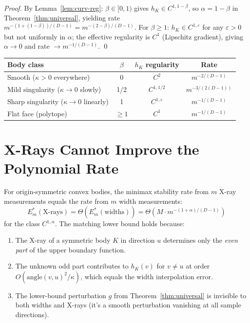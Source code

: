 \begin{proof}
By Lemma~\ref{lem:curv-reg}: $\beta \in [0,1)$ gives $h_K \in C^{1, 1-\beta}$, so $\alpha = 1 - \beta$ in Theorem~\ref{thm:universal}, yielding rate $m^{-(1 + (1-\beta))/(D-1)} = m^{-(2-\beta)/(D-1)}$. For $\beta \geq 1$: $h_K \in C^{1,\varepsilon}$ for any $\varepsilon > 0$ but not uniformly in $\alpha$; the effective regularity is $C^1$ (Lipschitz gradient), giving $\alpha \to 0$ and rate $\to m^{-1/(D-1)}$. \qed
\end{proof}

\begin{center}
\renewcommand{\arraystretch}{1.4}
\begin{tabular}{lccc}
\toprule
\textbf{Body class} & $\beta$ & $h_K$ \textbf{regularity} & \textbf{Rate} \\
\midrule
Smooth ($\kappa > 0$ everywhere) & 0 & $C^{2}$ & $m^{-2/(D-1)}$ \\
Mild singularity ($\kappa \to 0$ slowly) & 1/2 & $C^{1, 1/2}$ & $m^{-3/(2(D-1))}$ \\
Sharp singularity ($\kappa \to 0$ linearly) & 1 & $C^{1, \varepsilon}$ & $m^{-1/(D-1)}$ \\
Flat face (polytope) & $\geq 1$ & $C^{1}$ & $m^{-1/(D-1)}$ \\
\bottomrule
\end{tabular}
\end{center}


\section{X-Rays Cannot Improve the Polynomial Rate}

\begin{theorem}
\label{thm:parity}
For origin-symmetric convex bodies, the minimax stability rate from $m$ X-ray measurements equals the rate from $m$ width measurements:
\[
  E_m^*(\text{X-rays}) = \Theta(E_m^*(\text{widths})) = \Theta\!\left(M \cdot m^{-(1+\alpha)/(D-1)}\right)
\]
for the class $C^{1,\alpha}$. The matching lower bound holds because:
\begin{enumerate}
  \item The X-ray of a symmetric body $K$ in direction $u$ determines only the \emph{even part} of the upper boundary function.
  \item The unknown odd part contributes to $h_K(v)$ for $v \neq u$ at order $O(\mathrm{angle}(v,u)^2 / \kappa)$, which equals the width interpolation error.
  \item The lower-bound perturbation $g$ from Theorem~\ref{thm:universal} is invisible to both widths and X-rays (it's a smooth perturbation vanishing at all sample directions).
\end{enumerate}
\end{theorem}

